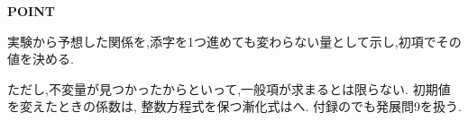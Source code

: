 \begin{bookpoint}
  \textbf{POINT}\par
  実験から予想した関係を,添字を1つ進めても変わらない量として示し,初項でその値を決める.
\end{bookpoint}
ただし,不変量が見つかったからといって,一般項が求まるとは限らない.
初期値を変えたときの係数は,
整数方程式を保つ漸化式は\mbox{}へ.
付録のでも発展問9を扱う.
